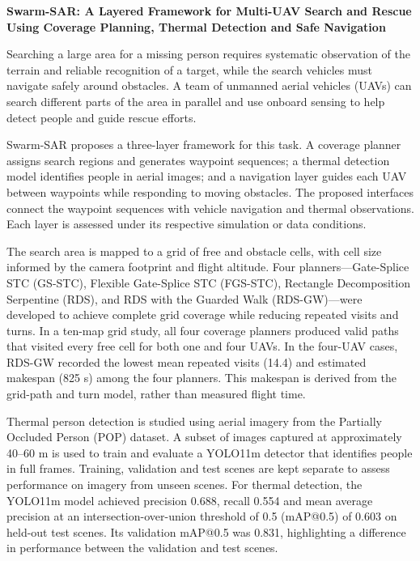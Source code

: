 \documentclass[11pt,a4paper]{article}
\begin{document}
\noindent\begin{minipage}{\textwidth}
\centering\Large\bfseries
Swarm-SAR: A Layered Framework for Multi-UAV Search and Rescue Using Coverage Planning, Thermal Detection and Safe Navigation
\end{minipage}
\par\vspace{0.5em}

Searching a large area for a missing person requires systematic observation of the terrain and reliable recognition of a target, while the search vehicles must navigate safely around obstacles. A team of unmanned aerial vehicles (UAVs) can search different parts of the area in parallel and use onboard sensing to help detect people and guide rescue efforts.

Swarm-SAR proposes a three-layer framework for this task. A coverage planner assigns search regions and generates waypoint sequences; a thermal detection model identifies people in aerial images; and a navigation layer guides each UAV between waypoints while responding to moving obstacles. The proposed interfaces connect the waypoint sequences with vehicle navigation and thermal observations. Each layer is assessed under its respective simulation or data conditions.

The search area is mapped to a grid of free and obstacle cells, with cell size informed by the camera footprint and flight altitude. Four planners---Gate-Splice STC (GS-STC), Flexible Gate-Splice STC (FGS-STC), Rectangle Decomposition Serpentine (RDS), and RDS with the Guarded Walk (RDS-GW)---were developed to achieve complete grid coverage while reducing repeated visits and turns. In a ten-map grid study, all four coverage planners produced valid paths that visited every free cell for both one and four UAVs. In the four-UAV cases, RDS-GW recorded the lowest mean repeated visits (14.4) and estimated makespan (825 s) among the four planners. This makespan is derived from the grid-path and turn model, rather than measured flight time.

Thermal person detection is studied using aerial imagery from the Partially Occluded Person (POP) dataset. A subset of images captured at approximately 40--60 m is used to train and evaluate a YOLO11m detector that identifies people in full frames. Training, validation and test scenes are kept separate to assess performance on imagery from unseen scenes. For thermal detection, the YOLO11m model achieved precision 0.688, recall 0.554 and mean average precision at an intersection-over-union threshold of 0.5 (mAP@0.5) of 0.603 on held-out test scenes. Its validation mAP@0.5 was 0.831, highlighting a difference in performance between the validation and test scenes.
\end{document}
